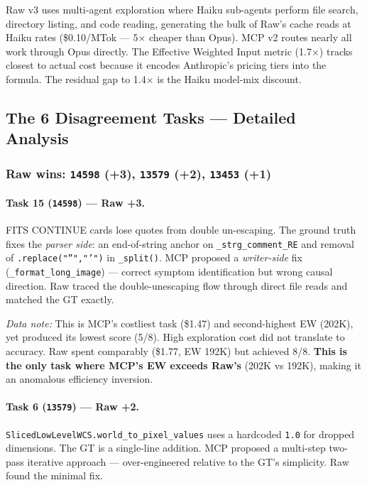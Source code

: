 \noindent
Raw v3 uses multi-agent exploration where Haiku sub-agents perform
file search, directory listing, and code reading, generating the bulk
of Raw's cache reads at Haiku rates (\$0.10/MTok --- 5$\times$ cheaper
than Opus).  MCP v2 routes nearly all work through Opus directly.
The Effective Weighted Input metric (1.7$\times$) tracks closest to
actual cost because it encodes Anthropic's pricing tiers into the
formula.  The residual gap to 1.4$\times$ is the Haiku model-mix
discount.

\subsection{The 6 Disagreement Tasks --- Detailed Analysis}
\label{sec:disagreements}

\subsubsection{Raw wins: \texttt{14598} (+3), \texttt{13579} (+2),
               \texttt{13453} (+1)}

\paragraph{Task 15 (\texttt{14598}) --- Raw +3.}
FITS CONTINUE cards lose quotes from double un-escaping.
The ground truth fixes the \emph{parser side}: an end-of-string anchor
on \texttt{\_strg\_comment\_RE} and removal of
\texttt{.replace("''","'")} in \texttt{\_split()}.
MCP proposed a \emph{writer-side} fix
(\texttt{\_format\_long\_image}) --- correct symptom identification but
wrong causal direction.
Raw traced the double-unescaping flow through direct file reads and
matched the GT exactly.

\emph{Data note:} This is MCP's costliest task (\$1.47) and
second-highest EW (202K), yet produced its lowest score (5/8).
High exploration cost did not translate to accuracy.
Raw spent comparably (\$1.77, EW 192K) but achieved 8/8.
\textbf{This is the only task where MCP's EW exceeds Raw's} (202K vs
192K), making it an anomalous efficiency inversion.

\paragraph{Task 6 (\texttt{13579}) --- Raw +2.}
\texttt{SlicedLowLevelWCS.world\_to\_pixel\_values} uses a hardcoded
\texttt{1.0} for dropped dimensions.
The GT is a single-line addition.
MCP proposed a multi-step two-pass iterative approach ---
over-engineered relative to the GT's simplicity.
Raw found the minimal fix.

